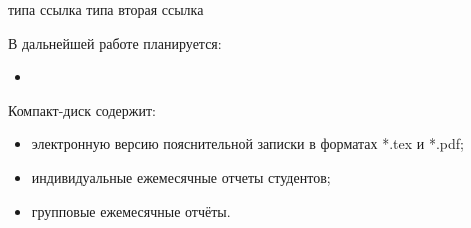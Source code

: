 \documentclass[russian,utf8,14pt,simple]{eskdtext}
\begin{document}
типа ссылка \cite{qtdoc}
типа вторая ссылка \cite{fedotovforenzika}

В дальнейшей работе планируется:
\begin{itemize}
\item
\end{itemize}

\newpage
\renewcommand{\refname}{Список использованных источников}


Компакт-диск содержит: 
\begin{itemize}
\item электронную версию пояснительной записки в форматах *.tex и *.pdf;
\item индивидуальные ежемесячные отчеты студентов;
\item групповые ежемесячные отчёты.
\end{itemize}
\end{document}
